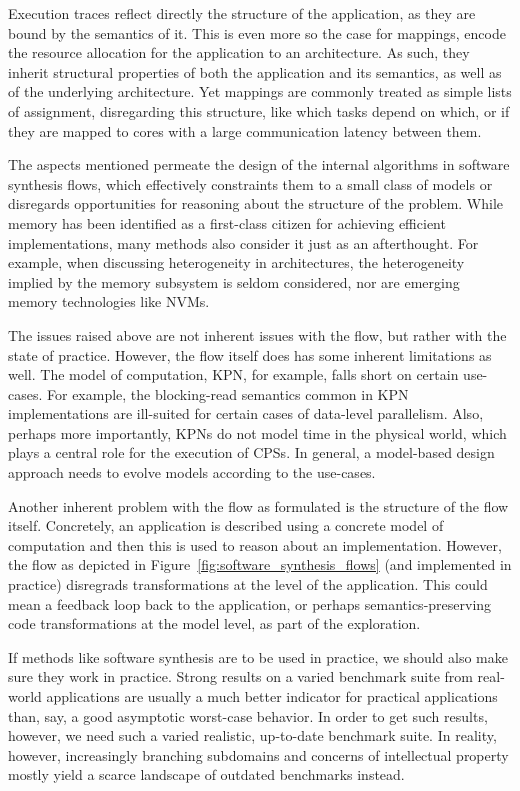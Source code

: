 Execution traces reflect directly the structure of the application, as they are bound by the semantics of it.
This is even more so the case for mappings, encode the resource allocation for the application to an architecture.
As such, they inherit structural properties of both the application and its semantics, as well as of the underlying architecture.
Yet mappings are commonly treated as simple lists of assignment, disregarding this structure, like which tasks depend on which, or if they are mapped to cores with a large communication latency between them.

The aspects mentioned permeate the design of the internal algorithms in software synthesis flows, which effectively constraints them to a small class of models or disregards opportunities for reasoning about the structure of the problem. 
While memory has been identified as a first-class citizen for achieving efficient implementations, many methods also consider it just as an afterthought.
For example, when discussing heterogeneity in architectures, the heterogeneity implied by the memory subsystem is seldom considered, nor are emerging memory technologies like \acp{NVM}.

The issues raised above are not inherent issues with the flow, but rather with the state of practice.
However, the flow itself does has some inherent limitations as well.
The model of computation, \ac{KPN}, for example, falls short on certain use-cases.
For example, the blocking-read semantics common in \ac{KPN} implementations are ill-suited for certain cases of data-level parallelism.
Also, perhaps more importantly, \acp{KPN} do not model time in the physical world, which plays a central role for the execution of \acp{CPS}.
In general, a model-based design approach needs to evolve models according to the use-cases.

Another inherent problem with the flow as formulated is the structure of the flow itself.
Concretely, an application is described using a concrete model of computation and then this is used to reason about an implementation.
However, the flow as depicted in Figure~\ref{fig:software_synthesis_flows} (and implemented in practice) disregrads transformations at the level of the application.
This could mean a feedback loop back to the application, or perhaps semantics-preserving code transformations at the model level, as part of the exploration.

If methods like software synthesis are to be used in practice, we should also make sure they work in practice. 
Strong results on a varied benchmark suite from real-world applications are usually a much better indicator for practical applications than, say, a good asymptotic worst-case behavior.
In order to get such results, however, we need such a varied realistic, up-to-date benchmark suite.
In reality, however, increasingly branching subdomains and concerns of intellectual property mostly yield a scarce landscape of outdated benchmarks instead.

